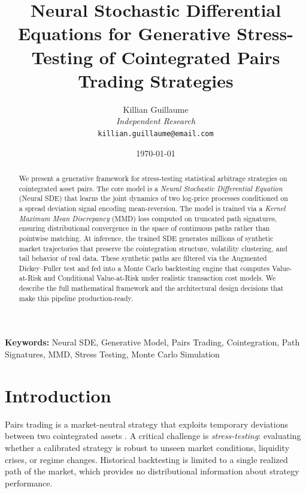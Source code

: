 \documentclass[11pt, a4paper]{article}
\title{%
  \textbf{Neural Stochastic Differential Equations for Generative Stress-Testing of Cointegrated Pairs Trading Strategies}
}
\author{
  Killian Guillaume \\
  \textit{Independent Research} \\
  \texttt{killian.guillaume@email.com}
}
\date{\today}
\begin{document}

\maketitle

\begin{abstract}
We present a generative framework for stress-testing statistical arbitrage strategies on cointegrated asset pairs. 
The core model is a \emph{Neural Stochastic Differential Equation} (Neural SDE) that learns the joint dynamics of two log-price processes conditioned on a spread deviation signal encoding mean-reversion. 
The model is trained via a \emph{Kernel Maximum Mean Discrepancy} (MMD) loss computed on truncated path signatures, ensuring distributional convergence in the space of continuous paths rather than pointwise matching.
At inference, the trained SDE generates millions of synthetic market trajectories that preserve the cointegration structure, volatility clustering, and tail behavior of real data.
These synthetic paths are filtered via the Augmented Dickey--Fuller test and fed into a Monte Carlo backtesting engine that computes Value-at-Risk and Conditional Value-at-Risk under realistic transaction cost models.
We describe the full mathematical framework and the architectural design decisions that make this pipeline production-ready.
\end{abstract}

\vspace{0.5em}
\noindent\textbf{Keywords:} Neural SDE, Generative Model, Pairs Trading, Cointegration, Path Signatures, MMD, Stress Testing, Monte Carlo Simulation

\section{Introduction}
\label{sec:intro}

Pairs trading is a market-neutral strategy that exploits temporary deviations between two cointegrated assets \citep{vidyamurthy2004pairs}. 
A critical challenge is \emph{stress-testing}: evaluating whether a calibrated strategy is robust to unseen market conditions, liquidity crises, or regime changes. 
Historical backtesting is limited to a single realized path of the market, which provides no distributional information about strategy performance.
\end{document}
